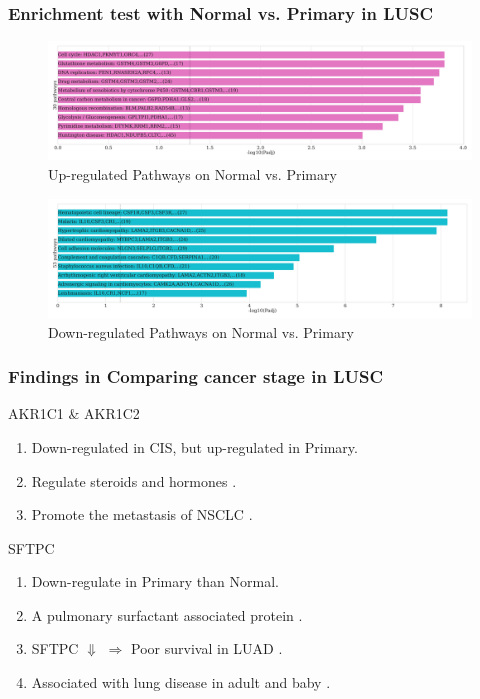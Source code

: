 \documentclass{beamer}
\begin{document}
    \begin{frame}
        \frametitle{Enrichment test with Normal vs. Primary in LUSC}

        \begin{figure}
            \includegraphics[width=0.8 \linewidth]{figures/DEG/Enrichment/STAR.SQC.Normal-Primary.Up.KEGG.pdf}
            \caption{Up-regulated Pathways on Normal vs. Primary}
        \end{figure}

        \begin{figure}
            \includegraphics[width=0.8 \linewidth]{figures/DEG/Enrichment/STAR.SQC.Normal-Primary.Down.KEGG.pdf}
            \caption{Down-regulated Pathways on Normal vs. Primary}
        \end{figure}
    \end{frame}

    \begin{frame}
        \frametitle{Findings in Comparing cancer stage in LUSC}

        \begin{block}{AKR1C1 \& AKR1C2}
            \begin{enumerate}
                \item Down-regulated in CIS, but up-regulated in Primary.
                \item Regulate steroids \cite{AKR1C1-1} and hormones \cite{AKR1C1-2} .
                \item Promote the metastasis of NSCLC \cite{AKR1C1-3}.
            \end{enumerate}
        \end{block}

        \begin{block}{SFTPC}
            \begin{enumerate}
                \item Down-regulate in Primary than Normal.
                \item A pulmonary surfactant associated protein \cite{SFTPC4}.
                \item SFTPC $\Downarrow$ $\Rightarrow$ Poor survival in LUAD \cite{SFTPC1}.
                \item Associated with lung disease in adult \cite{SFTPC2} and baby \cite{SFTPC3}.
            \end{enumerate}
        \end{block}
    \end{frame}
\end{document}
